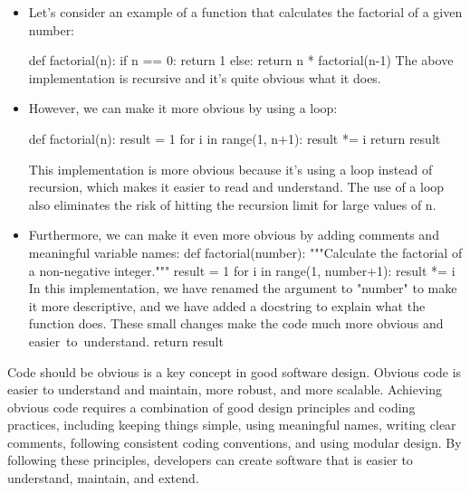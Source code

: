{ 

	\begin{itemize}
		\item Let's consider an example of a function that calculates the factorial of a given number:\newline
	
		def factorial(n):\newline
		if n == 0:\newline
		return 1\newline
		else:\newline
		return n * factorial(n-1)\newline
		\newline
		The above implementation is recursive and it's quite obvious what it does. \newpage
		
		\item However, we can make it more obvious by using a loop:\newline
		
		def factorial(n):\newline
		result = 1\newline
		for i in range(1, n+1):\newline
		result *= i\newline
		return result\newline
		
		This implementation is more obvious because it's using a loop instead of recursion, which makes it easier to read and understand. The use of a loop also eliminates the risk of hitting the recursion limit for large values of n.\newline
		\newpage
		\item Furthermore, we can make it even more obvious by adding comments and meaningful variable names:\newline
	    \newline
	    def factorial(number):\newline
		"""Calculate the factorial of a non-negative integer."""\newline
		result = 1\newline
		for i in range(1, number+1):\newline
		result *= i\newline
		\newline
		 In this implementation, we have renamed the argument to "number" to make it more descriptive, and we have added a docstring to explain what the function does. These small changes make the code much more obvious and easier to understand.
		return result \newline
		
	\end{itemize}
}
{
Code should be obvious is a key concept in good software design. Obvious code is easier to understand and maintain, more robust, and more scalable. Achieving obvious code requires a combination of good design principles and coding practices, including keeping things simple, using meaningful names, writing clear comments, following consistent coding conventions, and using modular design. By following these principles, developers can create software that is easier to understand, maintain, and extend.
}